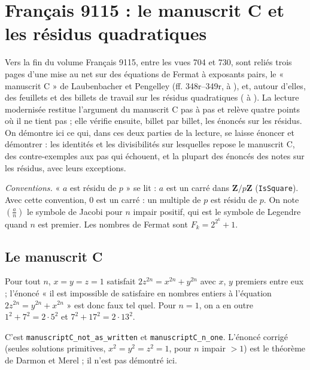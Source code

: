 \section[Français 9115 : le manuscrit C et les résidus quadratiques]{Français 9115 : le manuscrit C et les résidus quadratiques\protect{}}\label{sec:fr-9115-arithmetique}

Vers la fin du volume Français 9115, entre les vues 704 et 730, sont reliés trois pages d'une mise au net sur des équations de Fermat à exposants pairs, le « manuscrit C » de Laubenbacher et Pengelley (ff. 348r--349r,  à ), et, autour d'elles, des feuillets et des billets de travail sur les résidus quadratiques ( à ). La lecture modernisée restitue l'argument du manuscrit C pas à pas et relève quatre points où il ne tient pas ; elle vérifie ensuite, billet par billet, les énoncés sur les résidus. On démontre ici ce qui, dans ces deux parties de la lecture, se laisse énoncer et démontrer : les identités et les divisibilités sur lesquelles repose le manuscrit C, des contre-exemples aux pas qui échouent, et la plupart des énoncés des notes sur les résidus, avec leurs exceptions.

\noindent\emph{Conventions.} « $a$ est résidu de $p$ » se lit : $a$ est un carré dans $\mathbf Z/p\mathbf Z$ (\texttt{IsSquare}). Avec cette convention, $0$ est un carré : un multiple de $p$ est résidu de $p$. On note $\left(\frac{a}{n}\right)$ le symbole de Jacobi pour $n$ impair positif, qui est le symbole de Legendre quand $n$ est premier. Les nombres de Fermat sont $F_k = 2^{2^k}+1$.

\subsection*{Le manuscrit C}

\begin{contrexemple}
Pour tout $n$, $x = y = z = 1$ satisfait $2z^{2n} = x^{2n} + y^{2n}$ avec $x$, $y$ premiers entre eux ; l'énoncé « il est impossible de satisfaire en nombres entiers à l'équation $2z^{2n} = y^{2n} + x^{2n}$ » est donc faux tel quel. Pour $n = 1$, on a en outre $1^2 + 7^2 = 2\cdot 5^2$ et $7^2 + 17^2 = 2 \cdot 13^2$.
\end{contrexemple}

C'est \texttt{manuscriptC\_not\_as\_written} et \texttt{manuscriptC\_n\_one}. L'énoncé corrigé (seules solutions primitives, $x^2 = y^2 = z^2 = 1$, pour $n$ impair $> 1$) est le théorème de Darmon et Merel ; il n'est pas démontré ici.


